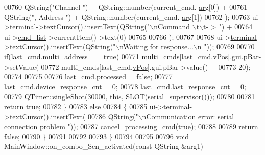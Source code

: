 \begin{DoxyCode}
00760                                             QString(\textcolor{stringliteral}{"Channel "}) + QString::number(current\_cmd.
      \hyperlink{a00004_a56e6c2d7315d0ae60a51e8b140c9cfe4}{arg}[0]) +
00761                                             QString(\textcolor{stringliteral}{", Address "}) + QString::number(current\_cmd.
      \hyperlink{a00004_a56e6c2d7315d0ae60a51e8b140c9cfe4}{arg}[1])
00762                                             );
00763       ui->\hyperlink{a00080_aae71c46ea4546df5994735dee573b2dd}{terminal}->textCursor().insertText(QString(\textcolor{stringliteral}{"\(\backslash\)nCommand \(\backslash\)t\(\backslash\)t- > "}) +
00764                                             ui->\hyperlink{a00080_aa66ece71395b435e915d384fb63bac1d}{cmd\_list}->currentItem()->text(0)
00765 
00766                                             );
00767 
00768       ui->\hyperlink{a00080_aae71c46ea4546df5994735dee573b2dd}{terminal}->textCursor().insertText(QString(\textcolor{stringliteral}{"\(\backslash\)nWaiting for response...\(\backslash\)n "}));
00769 
00770       \textcolor{keywordflow}{if}(last\_cmd.\hyperlink{a00004_a8e69b971c61ced27a7567efd2bf0db59}{multi\_address} == \textcolor{keyword}{true})
00771       multi\_cmds[last\_cmd.\hyperlink{a00004_a2b48b371fd84be2a8ad581b1ad708b88}{vPos}].gui.pBar->setValue(
00772               multi\_cmds[last\_cmd.\hyperlink{a00004_a2b48b371fd84be2a8ad581b1ad708b88}{vPos}].gui.pBar->value() +
00773               20);
00774 
00775 
00776       last\_cmd.\hyperlink{a00004_a3e88f779da9798a5da7dda227e2ca388}{processed}           = \textcolor{keyword}{false};
00777       last\_cmd.\hyperlink{a00004_a2b37e66e2555cf1dc26439ad7c30ea78}{device\_response\_cnt} = 0;
00778       last\_cmd.\hyperlink{a00004_a44be27a056581b6e706ec1ab28ce46e0}{last\_response\_cnt}   = 0;
00779       QTimer::singleShot(30000, \textcolor{keyword}{this}, SLOT(serial\_supervisor()));
00780 
00781       \textcolor{keywordflow}{return} \textcolor{keyword}{true};
00782       \}
00783       \textcolor{keywordflow}{else}
00784       \{
00785          ui->\hyperlink{a00080_aae71c46ea4546df5994735dee573b2dd}{terminal}->textCursor().insertText(
00786         QString(\textcolor{stringliteral}{"\(\backslash\)nCommunication error: serial connection problem "}));
00787         cancel\_processing\_cmd(\textcolor{keyword}{true});
00788 
00789        \textcolor{keywordflow}{return} \textcolor{keyword}{false};
00790       \}
00791 
00792 
00793 \}
00794 
00795 
00796 \textcolor{keywordtype}{void} MainWindow::on\_combo\_Sen\_activated(\textcolor{keyword}{const} QString &arg1)

\end{DoxyCode}
